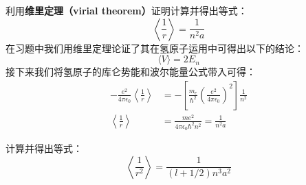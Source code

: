 \begin{exercise}{}\label{HfineS_exe1}
利用\textbf{维里定理（virial theorem）}证明计算并得出等式：
\begin{equation}
\left\langle\frac{1}{r}\right\rangle = \frac{1}{n^2a}
\end{equation}
在习题中我们用维里定理论证了其在氢原子运用中可得出以下的结论：
\begin{equation}
\langle V\rangle =2E_n
\end{equation}
接下来我们将氢原子的库仑势能和波尔能量公式带入可得：
\begin{align}
-\frac{e^2}{4\pi\epsilon_0}\left\langle \frac{1}{r}\right\rangle&=-\left[\frac {m_e}{\hbar^{2}} \left(\frac {e^ {2}}{4\pi \epsilon_0}\right)^ {2}\right]  \frac {1}{n^ {2}}\\
\left\langle \frac{1}{r}\right\rangle&=\frac{me^2}{4\pi\epsilon_0\hbar^2n^2}=\frac{1}{n^2a}
\end{align}


\end{exercise}
\begin{exercise}{}\label{HfineS_exe2}
计算并得出等式：
\begin{equation}
\left\langle \frac{1}{r^2}\right\rangle = \frac{1}{(l+1/2)n^3a^2}
\end{equation}
\end{exercise}

